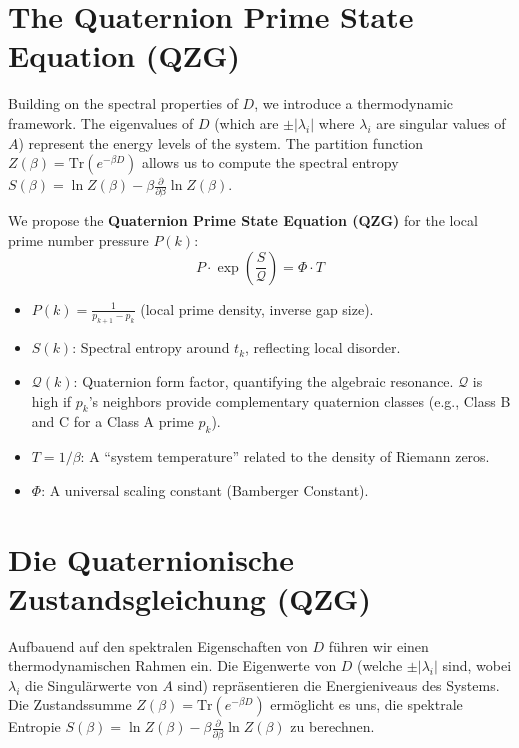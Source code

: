 \documentclass[11pt,twocolumn,a4paper]{article}
\newcommand{\entropy}{S}
\newcommand{\formfactor}{\mathcal{Q}}
\newcommand{\pressure}{P}
\newcommand{\temperature}{T}
\newcommand{\bamberger}{\Phi}
\theoremstyle{definition}
\begin{document}
\section{The Quaternion Prime State Equation (QZG)}
\label{sec:qzg}
Building on the spectral properties of $D$, we introduce a thermodynamic framework. The eigenvalues of $D$ (which are $\pm |\lambda_i|$ where $\lambda_i$ are singular values of $A$) represent the energy levels of the system. The partition function $Z(\beta) = \text{Tr}(e^{-\beta D})$ allows us to compute the spectral entropy $\entropy(\beta) = \ln Z(\beta) - \beta \frac{\partial}{\partial \beta} \ln Z(\beta)$.

We propose the \textbf{Quaternion Prime State Equation (QZG)} for the local prime number pressure $\pressure(k)$:
\begin{equation}
\label{eq:qzg}
\pressure \cdot \exp\left(\frac{\entropy}{\formfactor}\right) = \bamberger \cdot \temperature
\end{equation}
\begin{itemize}
    \item $\pressure(k) = \frac{1}{p_{k+1} - p_k}$ (local prime density, inverse gap size).
    \item $\entropy(k)$: Spectral entropy around $t_k$, reflecting local disorder.
    \item $\formfactor(k)$: Quaternion form factor, quantifying the algebraic resonance. $\formfactor$ is high if $p_k$'s neighbors provide complementary quaternion classes (e.g., Class B and C for a Class A prime $p_k$).
    \item $\temperature = 1/\beta$: A ``system temperature'' related to the density of Riemann zeros.
    \item $\bamberger$: A universal scaling constant (Bamberger Constant).
\end{itemize}

\section{Die Quaternionische Zustandsgleichung (QZG)}
\label{sec:qzg_de}
Aufbauend auf den spektralen Eigenschaften von $D$ führen wir einen thermodynamischen Rahmen ein. Die Eigenwerte von $D$ (welche $\pm |\lambda_i|$ sind, wobei $\lambda_i$ die Singulärwerte von $A$ sind) repräsentieren die Energieniveaus des Systems. Die Zustandssumme $Z(\beta) = \text{Tr}(e^{-\beta D})$ ermöglicht es uns, die spektrale Entropie $\entropy(\beta) = \ln Z(\beta) - \beta \frac{\partial}{\partial \beta} \ln Z(\beta)$ zu berechnen.
\end{document}

